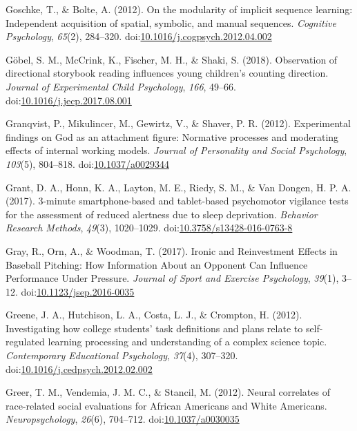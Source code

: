 \documentclass[english,man]{apa6}
\begin{document}
\hypertarget{ref-Goschke2012}{}
Goschke, T., \& Bolte, A. (2012). On the modularity of implicit sequence
learning: Independent acquisition of spatial, symbolic, and manual
sequences. \emph{Cognitive Psychology}, \emph{65}(2), 284--320.
doi:\href{https://doi.org/10.1016/j.cogpsych.2012.04.002}{10.1016/j.cogpsych.2012.04.002}

\hypertarget{ref-Gobel2018}{}
Göbel, S. M., McCrink, K., Fischer, M. H., \& Shaki, S. (2018).
Observation of directional storybook reading influences young children's
counting direction. \emph{Journal of Experimental Child Psychology},
\emph{166}, 49--66.
doi:\href{https://doi.org/10.1016/j.jecp.2017.08.001}{10.1016/j.jecp.2017.08.001}

\hypertarget{ref-Granqvist}{}
Granqvist, P., Mikulincer, M., Gewirtz, V., \& Shaver, P. R. (2012).
Experimental findings on God as an attachment figure: Normative
processes and moderating effects of internal working models.
\emph{Journal of Personality and Social Psychology}, \emph{103}(5),
804--818. doi:\href{https://doi.org/10.1037/a0029344}{10.1037/a0029344}

\hypertarget{ref-Grant2017a}{}
Grant, D. A., Honn, K. A., Layton, M. E., Riedy, S. M., \& Van Dongen,
H. P. A. (2017). 3-minute smartphone-based and tablet-based psychomotor
vigilance tests for the assessment of reduced alertness due to sleep
deprivation. \emph{Behavior Research Methods}, \emph{49}(3), 1020--1029.
doi:\href{https://doi.org/10.3758/s13428-016-0763-8}{10.3758/s13428-016-0763-8}

\hypertarget{ref-Gray2016}{}
Gray, R., Orn, A., \& Woodman, T. (2017). Ironic and Reinvestment
Effects in Baseball Pitching: How Information About an Opponent Can
Influence Performance Under Pressure. \emph{Journal of Sport and
Exercise Psychology}, \emph{39}(1), 3--12.
doi:\href{https://doi.org/10.1123/jsep.2016-0035}{10.1123/jsep.2016-0035}

\hypertarget{ref-Greene2012}{}
Greene, J. A., Hutchison, L. A., Costa, L. J., \& Crompton, H. (2012).
Investigating how college students' task definitions and plans relate to
self-regulated learning processing and understanding of a complex
science topic. \emph{Contemporary Educational Psychology}, \emph{37}(4),
307--320.
doi:\href{https://doi.org/10.1016/j.cedpsych.2012.02.002}{10.1016/j.cedpsych.2012.02.002}

\hypertarget{ref-Greer2012}{}
Greer, T. M., Vendemia, J. M. C., \& Stancil, M. (2012). Neural
correlates of race-related social evaluations for African Americans and
White Americans. \emph{Neuropsychology}, \emph{26}(6), 704--712.
doi:\href{https://doi.org/10.1037/a0030035}{10.1037/a0030035}
\end{document}
